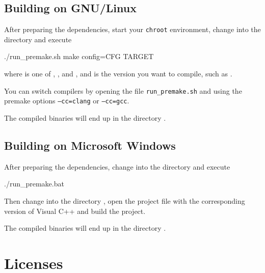 \section{Building on GNU/Linux}

After preparing the dependencies, start your \texttt{chroot}
environment, change into the directory  and execute

\begin{VerbatimBoth}
  ./run_premake.sh
  make config=CFG TARGET
\end{VerbatimBoth}

where  is one of ,
,  and
, and  is the version
you want to compile, such as .

You can switch compilers by opening the file \texttt{run\_premake.sh}
and using the premake options \texttt{--cc=clang} or
\texttt{--cc=gcc}.

The compiled binaries will end up in the directory .

\section{Building on Microsoft Windows}

After preparing the dependencies, change into the directory
 and execute

\begin{VerbatimBoth}
  ./run_premake.bat
\end{VerbatimBoth}

Then change into the directory , open the
project file with the corresponding version of Visual C++ and build
the project.

The compiled binaries will end up in the directory .

\chapter{Licenses}

\scriptsize

\normalsize

\scriptsize

\normalsize




